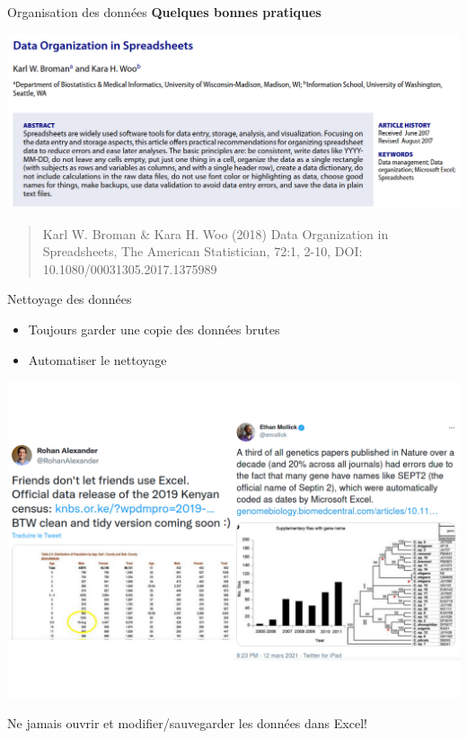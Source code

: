 \documentclass[
  ignorenonframetext,
]{beamer}
\providecommand{\tightlist}{%
  \setlength{\itemsep}{0pt}\setlength{\parskip}{0pt}}\usepackage{longtable,booktabs,array}
\begin{document}
\begin{frame}{Organisation des données}
\protect\hypertarget{organisation-des-donnuxe9es}{}
\textbf{Quelques bonnes pratiques}

\includegraphics{figures/DataOrganizationinSpreadsheets.png}

\begin{quote}
Karl W. Broman \& Kara H. Woo (2018) Data Organization in Spreadsheets,
The American Statistician, 72:1, 2-10, DOI:
10.1080/00031305.2017.1375989
\end{quote}
\end{frame}

\begin{frame}{Nettoyage des données}
\protect\hypertarget{nettoyage-des-donnuxe9es}{}
\begin{itemize}
\tightlist
\item
  Toujours garder une copie des données brutes
\item
  Automatiser le nettoyage
\end{itemize}

\includegraphics{MATH60602-diapos1_files/figure-beamer/unnamed-chunk-3-1.pdf}

Ne jamais ouvrir et modifier/sauvegarder les données dans Excel!
\end{frame}
\end{document}
